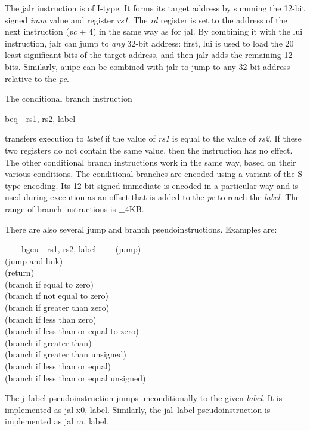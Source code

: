 \documentclass[11pt, twoside, pdftex]{article}
\newenvironment{ctabbing}%
{\begin{center}\begin{minipage}{\textwidth}\begin{tabbing}}
{\end{tabbing}\end{minipage}\end{center}}
\begin{document}
The {\sf jalr} instruction is of I-type. It forms its target address by summing the
12-bit signed {\it imm} value and register {\it rs1}. The {\it rd} register is set to the
address of the next instruction ({\it pc} + 4) in the same way as for {\sf jal}. 
By combining it with the {\sf lui} instruction, {\sf jalr} can jump to {\it any} 32-bit address:
first, {\sf lui} is used to load the 20 least-significant bits of the target address, and 
then {\sf jalr} adds the remaining 12 bits. Similarly, {\sf auipc} can be combined with
{\sf jalr} to jump to any 32-bit address relative to the {\it pc}. 

The conditional branch instruction
\vspace{-\baselineskip}
\begin{center}
{\sf beq~~rs1, rs2, label}
\end{center}
\noindent
transfers execution to {\it label} if the value of {\it rs1} is equal to the value of 
{\it rs2}. If these two registers do not contain the same value, then the instruction has
no effect. The other conditional branch instructions work in the same way, based on
their various conditions. The conditional branches are encoded using a variant of 
the S-type encoding. Its 12-bit signed immediate is encoded in a particular way and is used 
during execution as an offset that is added to the {\it pc} to reach the {\it label}.
The range of branch instructions is $\pm 4$KB.

\newpage
There are also several jump and branch pseudoinstructions. Examples are:
\begin{ctabbing}
~~~~\={\sf bgeu}~~\={\sf rs1, rs2, label}~~~~\=\kill
{}  \>(jump)\\
  \>(jump and link)\\
 \>\>(return)\\
  \>(branch if equal to zero)\\
  \>(branch if not equal to zero)\\
  \>(branch if greater than zero)\\
  \>(branch if less than zero)\\
  \>(branch if less than or equal to zero)\\
  \>(branch if greater than)\\
  \>(branch if greater than unsigned)\\
  \>(branch if less than or equal)\\
  \>(branch if less than or equal unsigned)\\
\end{ctabbing}
\vspace{-\baselineskip}
The {\sf j~label} pseudoinstruction jumps unconditionally 
to the given {\it label}. It is implemented
as {\sf jal x0, label}. Similarly, the {\sf jal~label} pseudoinstruction is implemented as
{\sf jal ra, label}.
\end{document}
